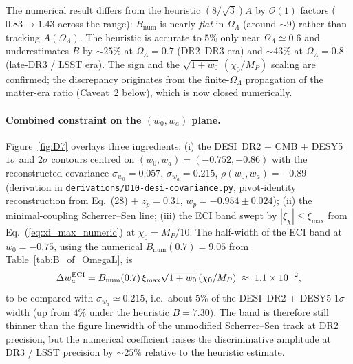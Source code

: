 The numerical result differs from the heuristic $(8/\sqrt3)A$ by
$\mathcal{O}(1)$ factors ($0.83\to 1.43$ across the range): $B_{\mathrm{num}}$
is nearly \emph{flat} in $\Omega_\Lambda$ (around $\sim 9$) rather than
tracking $A(\Omega_\Lambda)$. The heuristic is accurate to 5\% only near
$\Omega_\Lambda\simeq 0.6$ and underestimates $B$ by $\sim\!25\%$ at
$\Omega_\Lambda=0.7$ (DR2--DR3 era) and $\sim\!43\%$ at
$\Omega_\Lambda=0.8$ (late-DR3 / LSST era). The sign and the
$\sqrt{1+w_0}\,(\chi_0/M_P)$ scaling are confirmed; the discrepancy
originates from the finite-$\Omega_\Lambda$ propagation of the matter-era
ratio (Caveat~2 below), which is now closed numerically.

\paragraph{Combined constraint on the $(w_0,w_a)$ plane.}
Figure~\ref{fig:D7} overlays three ingredients: (i) the DESI~DR2 + CMB + DESY5~\cite{DESY5} $1\sigma$ and
$2\sigma$ contours centred on $(w_0,w_a)=(-0.752,-0.86)$ with the reconstructed covariance
$\sigma_{w_0}=0.057$, $\sigma_{w_a}=0.215$, $\rho(w_0,w_a)=-0.89$ (derivation in
\texttt{derivations/D10-desi-covariance.py}, pivot-identity reconstruction from
\cite{DESIDR2} Eq.~(28) + $z_p=0.31$, $w_p=-0.954\pm0.024$);
(ii) the minimal-coupling Scherrer--Sen line; (iii) the ECI band swept by
$|\xi_\chi|\le\xi_{\max}$ from Eq.~(\ref{eq:xi_max_numeric}) at $\chi_0=M_P/10$.
The half-width of the ECI band at $w_0=-0.75$, using the numerical
$B_{\mathrm{num}}(0.7)=9.05$ from Table~\ref{tab:B_of_OmegaL}, is
\begin{equation}
  \Delta w_a^{\rm ECI}
    = B_{\mathrm{num}}(0.7)\,\xi_{\max}\sqrt{1+w_0}\,(\chi_0/M_P)
    \;\approx\;1.1\times 10^{-2},
\end{equation}
to be compared with $\sigma_{w_a}\!\simeq\!0.215$, i.e.\ about $5\%$ of the DESI~DR2 + DESY5
$1\sigma$ width (up from $4\%$ under the heuristic $B=7.30$). The band is therefore
still thinner than the figure linewidth of the unmodified Scherrer--Sen track at DR2
precision, but the numerical coefficient raises the discriminative amplitude at DR3 / LSST
precision by $\sim\!25\%$ relative to the heuristic estimate.

